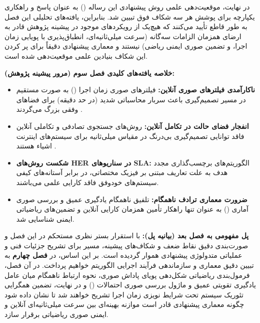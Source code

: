 \documentclass[oneside,openany,phd]{TMU-Thesis}
\begin{document}
در نهایت، موقعیت‌دهی علمی روش پیشنهادی این رساله () به عنوان پاسخ و راهکاری یکپارچه برای پوشش هر سه شکاف فوق تبیین شد. بنابراین، یافته‌های تحلیلی این فصل به طور قاطع تأیید می‌کنند که هیچ‌یک از رویکردهای موجود در پیشینه پژوهش قادر به ارضای همزمان الزامات سه‌گانه (سرعت میلی‌ثانیه‌ای، انطباق‌پذیری با پویایی زمان اجرا، و تضمین صوری ایمنی ریاضی) نیستند و معماری پیشنهادی  دقیقاً برای پر کردن این شکاف بنیادین علمی موقعیت‌دهی شده است.

\begin{framed}
\noindent\textbf{خلاصه یافته‌های کلیدی فصل سوم (مرور پیشینه پژوهش):}
\begin{itemize}
    \item \textbf{ناکارآمدی فیلترهای صوری آنلاین:} فیلترهای صوری زمان اجرا () به صورت مستقیم در مسیر تصمیم‌گیری باعث سربار محاسباتی شدید (در حد دقیقه) برای فضاهای وفقی بزرگ می‌گردند \cite{camara2020quantitative, calinescu2011formal}.
    \item \textbf{انفجار فضای حالت در تکامل آنلاین:} روش‌های جستجوی تصادفی و تکاملی آنلاین فاقد توانایی تصمیم‌گیری بی‌درنگ در مقیاس میلی‌ثانیه برای سیستم‌های اینترنت اشیاء هستند \cite{coker2015sass, kinneer2021information}.
    \item \textbf{شکست روش‌های HER در سناریوهای SLA:} الگوریتم‌های برچسب‌گذاری مجدد هدف به علت تعاریف مبتنی بر فیزیک مختصاتی، در برابر آستانه‌های کیفی سیستم‌های خودوفق فاقد کارایی علمی می‌باشند.
    \item \textbf{ضرورت معماری ترادف ناهمگام:} تلفیق ناهمگام یادگیری عمیق و بررسی صوری آماری () به عنوان تنها راهکار تأمین همزمان کارایی آنلاین و تضمین‌های ریاضیاتی ایمنی شناسایی شد.
\end{itemize}
\end{framed}

\textbf{پل مفهومی به فصل بعد (بیانیه پل):}
با استقرار بستر نظری مستحکم در این فصل و صورت‌بندی دقیق نقاط ضعف و شکاف‌های پیشینه، مسیر برای تشریح جزئیات فنی و عملیاتی متدولوژی پیشنهادی هموار گردیده است. بر این اساس، در \textbf{فصل چهارم} به تبیین دقیق معماری و سازماندهی فرآیند اجرایی الگوریتم  خواهیم پرداخت. در آن فصل، فرمول‌بندی ریاضیاتی شکل‌دهی پویای پاداش صوری، نحوه ارتباط ناهمگام میان عامل یادگیری تقویتی عمیق و ماژول بررسی صوری احتمالات () و در نهایت، تضمین همگرایی تئوریک سیستم تحت شرایط نویزی زمان اجرا تشریح خواهند شد تا نشان داده شود چگونه معماری پیشنهادی قادر است موازنه بهینه‌ای بین سرعت میلی‌ثانیه‌ای آنلاین و ایمنی صوری ریاضیاتی برقرار سازد.
\newpage




\ifstandalone


\fi
\end{document}
